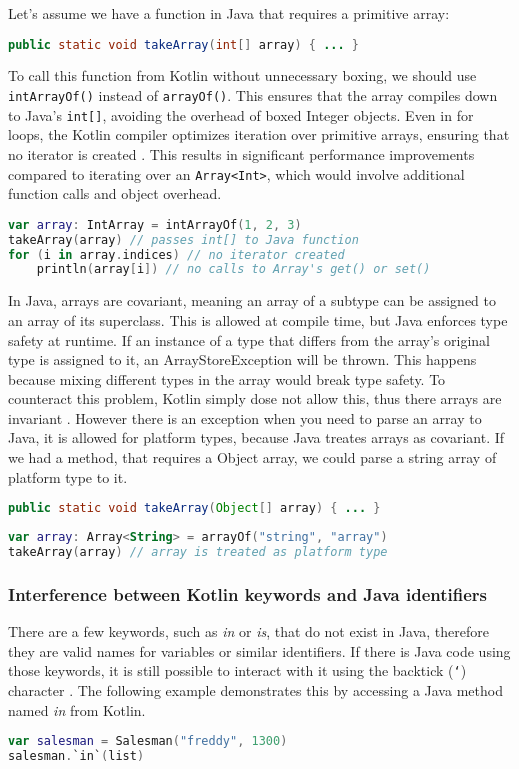 \documentclass[a4paper,11pt]{article}
\begin{document}
Let's assume we have a function in Java that requires a primitive array:
\begin{lstlisting}[language=Java]
public static void takeArray(int[] array) { ... }
\end{lstlisting}
To call this function from Kotlin without unnecessary boxing, we should use \texttt{intArrayOf()} instead of \texttt{arrayOf()}. This ensures that the array compiles down to Java's \texttt{int[]}, avoiding the overhead of boxed Integer objects. Even in for loops, the Kotlin compiler optimizes iteration over primitive arrays, ensuring that no iterator is created \cite{interop-arrays}. This results in significant performance improvements compared to iterating over an \texttt{Array<Int>}, which would involve additional function calls and object overhead.
\begin{lstlisting}[language=Kotlin]
var array: IntArray = intArrayOf(1, 2, 3)
takeArray(array) // passes int[] to Java function
for (i in array.indices) // no iterator created
    println(array[i]) // no calls to Array's get() or set()
\end{lstlisting}
In Java, arrays are covariant, meaning an array of a subtype can be assigned to an array of its superclass. This is allowed at compile time, but Java enforces type safety at runtime. If an instance of a type that differs from the array's original type is assigned to it, an ArrayStoreException will be thrown. This happens because mixing different types in the array would break type safety. To counteract this problem, Kotlin simply dose not allow this, thus there arrays are invariant \cite{interop-arrays}. However there is an exception when you need to parse an array to Java, it is allowed for platform types, because Java treates arrays as covariant. If we had a method, that requires a Object array, we could parse a string array of platform type to it.
\begin{lstlisting}[language=Java]
public static void takeArray(Object[] array) { ... }
\end{lstlisting}
\begin{lstlisting}[language=Kotlin]
var array: Array<String> = arrayOf("string", "array")
takeArray(array) // array is treated as platform type
\end{lstlisting}

\subsubsection{Interference between Kotlin keywords and Java identifiers}
There are a few keywords, such as \textit{in} or \textit{is}, that do not exist in Java, therefore they are valid names for variables or similar identifiers. If there is Java code using those keywords, it is still possible to interact with it using the backtick (\texttt{`}) character \cite{interop-escaping-identifiers}. The following example demonstrates this by accessing a Java method named \textit{in} from Kotlin.
\begin{lstlisting}[language=Kotlin]
var salesman = Salesman("freddy", 1300)
salesman.`in`(list)
\end{lstlisting}
\end{document}
